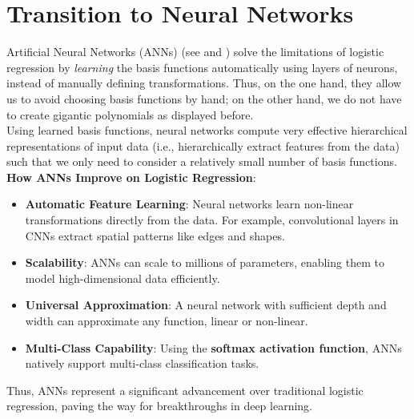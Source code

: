 \section{Transition to Neural Networks}
Artificial Neural Networks (ANNs) (see \cite[chapter 5]{bishop2006pattern} and \cite[chapter 6]{goodfellow2016deep}) solve the limitations of logistic regression by \emph{learning} the basis functions automatically using layers of neurons, instead of manually defining transformations. Thus, on the one hand, they allow us to avoid choosing basis functions by hand; on the other hand, we do not have to create gigantic polynomials as displayed before.\\

Using learned basis functions, neural networks compute very effective hierarchical
representations of input data (i.e., hierarchically extract features from the data) such that we only need to consider a relatively small number of basis functions.\\

\textbf{How ANNs Improve on Logistic Regression}:
\begin{itemize}
    \item \textbf{Automatic Feature Learning}:
    Neural networks learn non-linear transformations directly from the data. For example, convolutional layers in CNNs extract spatial patterns like edges and shapes.
    
    \item \textbf{Scalability}: ANNs can scale to millions of parameters, enabling them to model high-dimensional data efficiently.
    
    \item \textbf{Universal Approximation}: A neural network with sufficient depth and width can approximate any function, linear or non-linear.

    \item \textbf{Multi-Class Capability}: Using the \textbf{softmax activation function}, ANNs natively support multi-class classification tasks.

\end{itemize}
Thus, ANNs represent a significant advancement over traditional logistic regression, paving the way for breakthroughs in deep learning.








